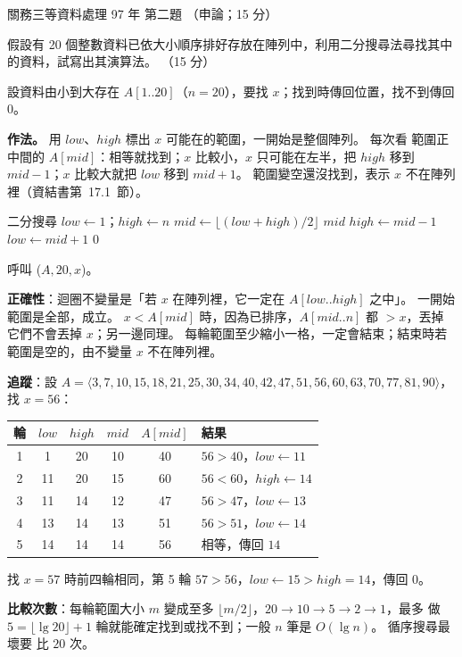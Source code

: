 \begin{pastexam}[label={px:gw3-097-ds-02}]{關務三等資料處理 97 年 第二題}
（申論；15 分）

假設有 20 個整數資料已依大小順序排好存放在陣列中，利用二分搜尋法尋找其中的資料，試寫出其演算法。
（15 分）
\end{pastexam}

\begin{pastsoln}
設資料由小到大存在 $A[1..20]$（$n = 20$），要找 $x$；找到時傳回位置，找不到傳回 $0$。

\textbf{作法。} 用 $\mathit{low}$、$\mathit{high}$ 標出 $x$ 可能在的範圍，一開始是整個陣列。 每次看
範圍正中間的 $A[\mathit{mid}]$：相等就找到；$x$ 比較小，$x$ 只可能在左半，把 $\mathit{high}$ 移到
$\mathit{mid} - 1$；$x$ 比較大就把 $\mathit{low}$ 移到 $\mathit{mid} + 1$。 範圍變空還沒找到，表示
$x$ 不在陣列裡（資結書第~17.1~節）。
\begin{pseudo}{二分搜尋}
    \State $\mathit{low} \gets 1$；$\mathit{high} \gets n$
        \State $\mathit{mid} \gets \lfloor (\mathit{low} + \mathit{high}) / 2 \rfloor$
            \State \Return $\mathit{mid}$ 
            \State $\mathit{high} \gets \mathit{mid} - 1$ 
        \Else
            \State $\mathit{low} \gets \mathit{mid} + 1$ 
        \EndIf
    \EndWhile
    \State \Return $0$ 
\EndFunction
\end{pseudo}
呼叫 ($A, 20, x$)。

\textbf{正確性}：迴圈不變量是「若 $x$ 在陣列裡，它一定在 $A[\mathit{low}..\mathit{high}]$ 之中」。
一開始範圍是全部，成立。 $x < A[\mathit{mid}]$ 時，因為已排序，$A[\mathit{mid}..n]$ 都 $> x$，丟掉
它們不會丟掉 $x$；另一邊同理。 每輪範圍至少縮小一格，一定會結束；結束時若範圍是空的，由不變量 $x$
不在陣列裡。

\textbf{追蹤}：設 $A = \langle 3, 7, 10, 15, 18, 21, 25, 30, 34, 40, 42, 47, 51, 56, 60, 63, 70, 77, 81,
90 \rangle$，找 $x = 56$：
\begin{center}
\small
\begin{tabular}{cccccl}
\toprule
輪 & $\mathit{low}$ & $\mathit{high}$ & $\mathit{mid}$ & $A[\mathit{mid}]$ & 結果 \\
\midrule
1 & 1 & 20 & 10 & 40 & $56 > 40$，$\mathit{low} \gets 11$ \\
2 & 11 & 20 & 15 & 60 & $56 < 60$，$\mathit{high} \gets 14$ \\
3 & 11 & 14 & 12 & 47 & $56 > 47$，$\mathit{low} \gets 13$ \\
4 & 13 & 14 & 13 & 51 & $56 > 51$，$\mathit{low} \gets 14$ \\
5 & 14 & 14 & 14 & 56 & 相等，傳回 $14$ \\
\bottomrule
\end{tabular}
\end{center}
找 $x = 57$ 時前四輪相同，第 5 輪 $57 > 56$，$\mathit{low} \gets 15 > \mathit{high} = 14$，傳回 $0$。

\textbf{比較次數}：每輪範圍大小 $m$ 變成至多 $\lfloor m/2 \rfloor$，$20 \to 10 \to 5 \to 2 \to 1$，最多
做 $5 = \lfloor \lg 20 \rfloor + 1$ 輪就能確定找到或找不到；一般 $n$ 筆是 $O(\lg n)$。 循序搜尋最壞要
比 $20$ 次。
\end{pastsoln}
